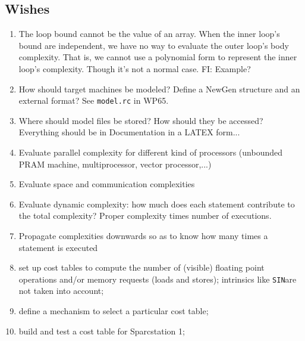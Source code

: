 \subsection{Wishes}

\begin{enumerate}

  \item The loop bound cannot be the value of an array.
        When the inner loop's bound are independent, we have no way to
        evaluate the outer loop's body complexity.
        That is, we cannot use a polynomial form to represent the inner
        loop's complexity. 
        Though it's not a normal case. FI: Example?

  \item How should target machines be modeled? Define a NewGen structure
        and an external format? See \verb+model.rc+ in WP65.

  \item Where should model files be stored? How
        should they be accessed? Everything should be in Documentation
        in a LATEX form...

  \item Evaluate parallel complexity for different kind of processors
        (unbounded PRAM machine, multiprocessor, vector processor,...)

  \item Evaluate space and communication complexities

  \item Evaluate dynamic complexity: how much does each statement contribute
        to the total complexity? Proper complexity times number of executions.

  \item Propagate complexities downwards so as to know how many times a
        statement is executed

  \item set up cost tables to compute the number of (visible) floating point
        operations and/or memory requests (loads and stores); intrinsics
        like \verb+SIN+are not taken into account;

  \item define a mechanism to select a particular cost table;

  \item build and test a cost table for Sparcstation 1;

\end{enumerate}

